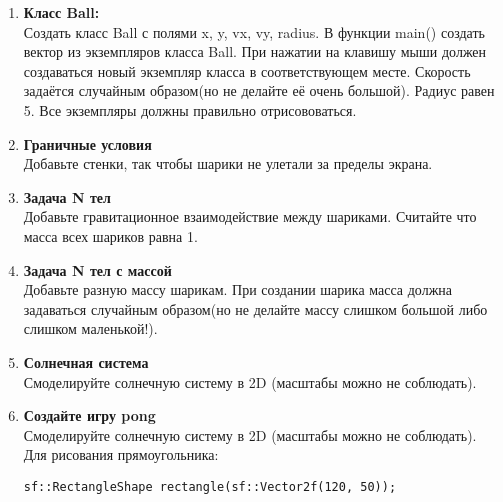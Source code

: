 \documentclass{article}
\begin{document}
\begin{enumerate}
\item \textbf{Класс Ball:} \\
Создать класс Ball с полями x, y, vx, vy, radius. В функции main() создать вектор из экземпляров класса Ball. При нажатии на клавишу мыши должен создаваться новый экземпляр класса в соответствующем месте. Скорость задаётся случайным образом(но не делайте её очень большой). Радиус равен 5. Все экземпляры должны правильно отрисововаться.
\item \textbf{Граничные условия} \\
Добавьте стенки, так чтобы шарики не улетали за пределы экрана.
\item \textbf{Задача N тел} \\
Добавьте гравитационное взаимодействие между шариками. Считайте что масса всех шариков равна 1.
\item \textbf{Задача N тел с массой} \\
Добавьте разную массу шарикам. При создании шарика масса должна задаваться случайным образом(но не делайте массу слишком большой либо слишком маленькой!).
\item \textbf{Солнечная система} \\
Смоделируйте солнечную систему в 2D (масштабы можно не соблюдать).
\item \textbf{Создайте игру pong} \\
Смоделируйте солнечную систему в 2D (масштабы можно не соблюдать). Для рисования прямоугольника:
\begin{lstlisting}
sf::RectangleShape rectangle(sf::Vector2f(120, 50));
\end{lstlisting}
\end{enumerate}
\end{document}
